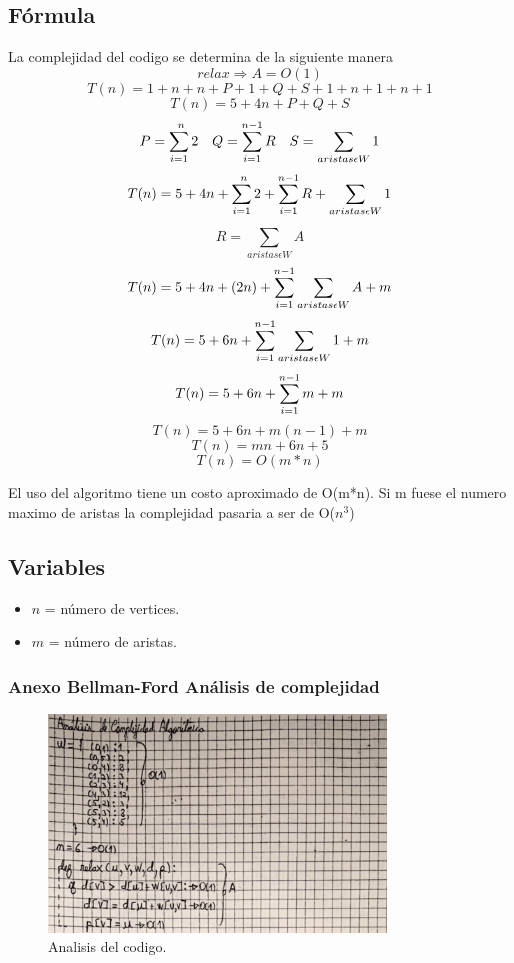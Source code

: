\subsection*{Fórmula }
La complejidad del codigo se determina de la siguiente manera
\[relax \Longrightarrow A = O(1)\]
\[T(n) = 1 + n + n + P + 1 + Q + S + 1 + n + 1 + n + 1 \]
\[T(n) = 5 + 4n + P + Q + S \]
\[P = \sum_{i = 1}^{\\n} 2 \quad Q = \sum_{i = 1}^{\\n-1} R \quad S = \sum_{aristas \epsilon W }^{} 1 \]
\[T(n) = 5 + 4n + \sum_{i = 1}^{\\n} 2 + \sum_{i = 1}^{\\n-1} R + \sum_{aristas \epsilon W }^{} 1 \]
\[R = \sum_{aristas \epsilon W }^{} A \]
\[T(n) = 5 + 4n + (2n) + \sum_{i = 1}^{\\n-1} \sum_{aristas \epsilon W }^{} A + m\]
\[T(n) = 5 + 6n + \sum_{i = 1}^{\\n-1} \sum_{aristas \epsilon W }^{} 1 + m\]
\[T(n) = 5 + 6n + \sum_{i = 1}^{\\n-1} m + m\]
\[T(n) = 5 + 6n + m(n-1) + m\]
\[T(n) = mn + 6n + 5\]
\[T(n) = O(m*n)\]

El uso del algoritmo tiene un costo aproximado de O(m*n). Si m fuese el numero maximo de aristas la complejidad pasaria a ser de O($n^3$)

\subsection*{Variables}

\begin{itemize}
    \item \( n \) = número de vertices.
    \item \( m \) = número de aristas.
\end{itemize}

\subsubsection{Anexo Bellman-Ford Análisis de complejidad}
\begin{figure}[H]
	\centering
	\includegraphics[width=0.8\textwidth]{complejidad_distancia_ejem2_1.png}
	\caption{Analisis del codigo.}
	\label{fig:complejidad1}
\end{figure}

